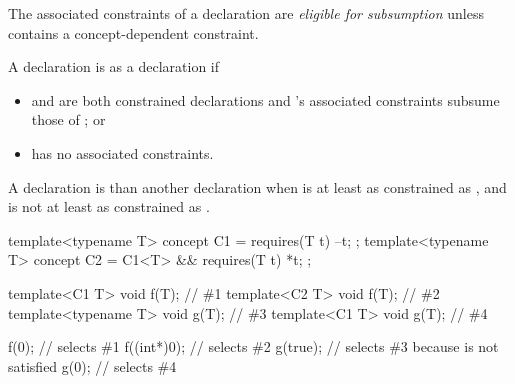 \documentclass{wg21}
\begin{document}
\begin{addedblock}

    The associated constraints  of a declaration  are \emph{eligible for subsumption}
    unless  contains a concept-dependent constraint.

\end{addedblock}


\pnum
A declaration  is
 as
a declaration  if
\begin{itemize}
    \item {} and  are both constrained declarations and
    's associated constraints
     subsume those of ; or

    \item {} has no associated constraints.
\end{itemize}

\pnum
A declaration  is 
than another declaration  when  is at least as
constrained as , and  is not at least as
constrained as .
\begin{example}
\begin{codeblock}
    template<typename T> concept C1 = requires(T t) { --t; };
    template<typename T> concept C2 = C1<T> && requires(T t) { *t; };

    template<C1 T> void f(T);       // \#1
    template<C2 T> void f(T);       // \#2
    template<typename T> void g(T); // \#3
    template<C1 T> void g(T);       // \#4

    f(0);                           // selects \#1
    f((int*)0);                     // selects \#2
    g(true);                        // selects \#3 because  is not satisfied
    g(0);                           // selects \#4
\end{codeblock}
\end{example}
\end{document}

